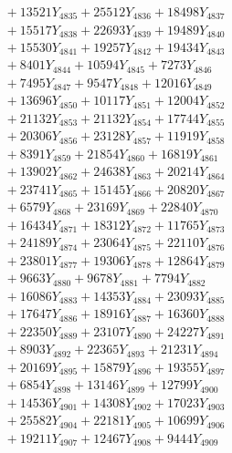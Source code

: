 \documentclass[a4paper,10pt]{article}
\begin{document}
{\begin{align}
&\;  + 13521 Y_{4835} + 25512 Y_{4836} + 18498 Y_{4837} \\[0.3ex]
&\;  + 15517 Y_{4838} + 22693 Y_{4839} + 19489 Y_{4840} \\[0.3ex]
&\;  + 15530 Y_{4841} + 19257 Y_{4842} + 19434 Y_{4843} \\[0.3ex]
&\;  + 8401 Y_{4844} + 10594 Y_{4845} + 7273 Y_{4846} \\[0.3ex]
&\;  + 7495 Y_{4847} + 9547 Y_{4848} + 12016 Y_{4849} \\[0.3ex]
&\;  + 13696 Y_{4850} + 10117 Y_{4851} + 12004 Y_{4852} \\[0.3ex]
&\;  + 21132 Y_{4853} + 21132 Y_{4854} + 17744 Y_{4855} \\[0.3ex]
&\;  + 20306 Y_{4856} + 23128 Y_{4857} + 11919 Y_{4858} \\[0.5ex]\allowbreak
&\;  + 8391 Y_{4859} + 21854 Y_{4860} + 16819 Y_{4861} \\[0.3ex]
&\;  + 13902 Y_{4862} + 24638 Y_{4863} + 20214 Y_{4864} \\[0.3ex]
&\;  + 23741 Y_{4865} + 15145 Y_{4866} + 20820 Y_{4867} \\[0.3ex]
&\;  + 6579 Y_{4868} + 23169 Y_{4869} + 22840 Y_{4870} \\[0.3ex]
&\;  + 16434 Y_{4871} + 18312 Y_{4872} + 11765 Y_{4873} \\[0.3ex]
&\;  + 24189 Y_{4874} + 23064 Y_{4875} + 22110 Y_{4876} \\[0.3ex]
&\;  + 23801 Y_{4877} + 19306 Y_{4878} + 12864 Y_{4879} \\[0.3ex]
&\;  + 9663 Y_{4880} + 9678 Y_{4881} + 7794 Y_{4882} \\[0.3ex]
&\;  + 16086 Y_{4883} + 14353 Y_{4884} + 23093 Y_{4885} \\[0.3ex]
&\;  + 17647 Y_{4886} + 18916 Y_{4887} + 16360 Y_{4888} \\[0.5ex]\allowbreak
&\;  + 22350 Y_{4889} + 23107 Y_{4890} + 24227 Y_{4891} \\[0.3ex]
&\;  + 8903 Y_{4892} + 22365 Y_{4893} + 21231 Y_{4894} \\[0.3ex]
&\;  + 20169 Y_{4895} + 15879 Y_{4896} + 19355 Y_{4897} \\[0.3ex]
&\;  + 6854 Y_{4898} + 13146 Y_{4899} + 12799 Y_{4900} \\[0.3ex]
&\;  + 14536 Y_{4901} + 14308 Y_{4902} + 17023 Y_{4903} \\[0.3ex]
&\;  + 25582 Y_{4904} + 22181 Y_{4905} + 10699 Y_{4906} \\[0.3ex]
&\;  + 19211 Y_{4907} + 12467 Y_{4908} + 9444 Y_{4909} \\[0.3ex]

\end{align}}
\end{document}
